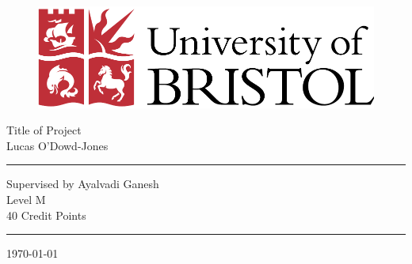 \begin{titlepage}
\thispagestyle{empty}

\begin{figure}[h]
\begin{center}
\includegraphics[scale=0.5]{graphics/uob_logo.pdf} %
\end{center}
\end{figure}

\begin{center}
{\Large Title of Project\\ \vspace{1cm}Lucas O'Dowd-Jones}
\end{center}

\vspace{3cm}
\hrule
\begin{center}
Supervised by Ayalvadi Ganesh\\
Level M\\
40 Credit Points
\end{center}
\hrule

\vspace{3cm}
\begin{center}
\today
\end{center}

\end{titlepage}
